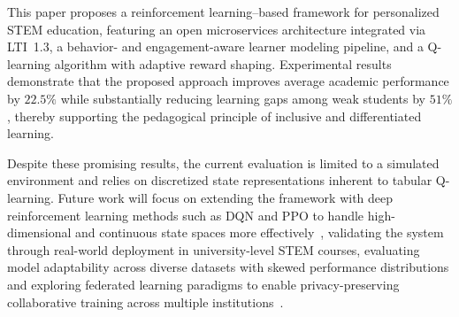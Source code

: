\documentclass[conference]{IEEEtran}
\begin{document}
This paper proposes a reinforcement learning–based framework for personalized STEM education, featuring an open microservices architecture integrated via LTI~1.3, a behavior- and engagement-aware learner modeling pipeline, and a Q-learning algorithm with adaptive reward shaping. Experimental results demonstrate that the proposed approach improves average academic performance by $22.5\%$ while substantially reducing learning gaps among weak students by $51\%$, thereby supporting the pedagogical principle of inclusive and differentiated learning.

Despite these promising results, the current evaluation is limited to a simulated environment and relies on discretized state representations inherent to tabular Q-learning. Future work will focus on extending the framework with deep reinforcement learning methods such as DQN and PPO to handle high-dimensional and continuous state spaces more effectively~\cite{mnih2015human}, validating the system through real-world deployment in university-level STEM courses, evaluating model adaptability across diverse datasets with skewed performance distributions and exploring federated learning paradigms to enable privacy-preserving collaborative training across multiple institutions~\cite{gligorea2023adaptive}.



\end{document}
